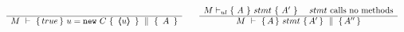 {{\noindent
\small
\noindent
\begin{center}
$  
\begin{array}{lcr}
\inferruleNoName 
	{ 
	 	
	}  	 
	{	 
 	\hprovesN  {M}  
	                {  true  }  
 			   {\  u = \prg{new}\ C \ }
 			   {\  \inside{u}\  }  { \ A \ }
	}
	& &
\inferruleNoName 
	{  
	  M \vdash_{ul} \{ \ A\ \} {\ stmt\ }\{\ A'\ \}   \ \ \ \ stmt\  \mbox{calls no methods}  %
	}
	{\hprovesN{M}  {A} {\ stmt \ } {A'} {A''} } 
\end{array}
$
\end{center}

\normalsize

}}
